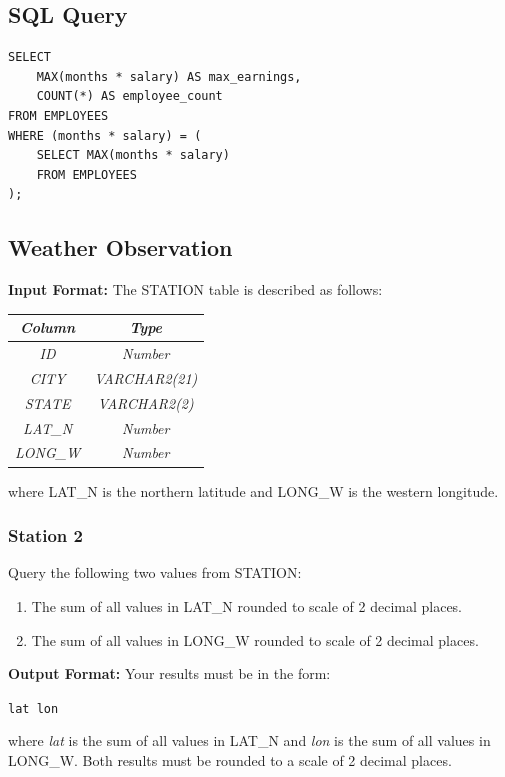 \documentclass[12pt,a4paper]{article}
\renewcommand{\arraystretch}{1.5} %
\begin{document}
\subsection*{SQL Query}
\begin{lstlisting}[style=sqlstyle]
SELECT
    MAX(months * salary) AS max_earnings,
    COUNT(*) AS employee_count
FROM EMPLOYEES
WHERE (months * salary) = (
    SELECT MAX(months * salary)
    FROM EMPLOYEES
);
\end{lstlisting}
\subsection{Weather Observation}
\label{subsec:station-format}
\textbf{Input Format:}
The STATION table is described as follows:
\begin{table}[H]
\centering
\renewcommand{\arraystretch}{1.3}
\begin{tabular}{|c|c|}
\hline
\textit{Column} & \textit{Type} \\ \hline
\textit{ID} & \textit{Number} \\ \hline
\textit{CITY} & \textit{VARCHAR2(21)} \\ \hline
\textit{STATE} & \textit{VARCHAR2(2)} \\ \hline
\textit{LAT\_N} & \textit{Number} \\ \hline
\textit{LONG\_W} & \textit{Number} \\ \hline
\end{tabular}
\end{table}
where LAT\_N is the northern latitude and LONG\_W is the western longitude.
\subsubsection{Station 2}
Query the following two values from STATION:
\begin{enumerate}
    \item The sum of all values in LAT\_N rounded to scale of 2 decimal places.
    \item The sum of all values in LONG\_W rounded to scale of 2 decimal places.
\end{enumerate}
\textbf{Output Format:}
Your results must be in the form:
\begin{center}
\texttt{lat lon}
\end{center}
\noindent
where \textit{lat} is the sum of all values in LAT\_N and \textit{lon} is the sum of all values in LONG\_W. Both results must be rounded to a scale of 2 decimal places.
\end{document}
